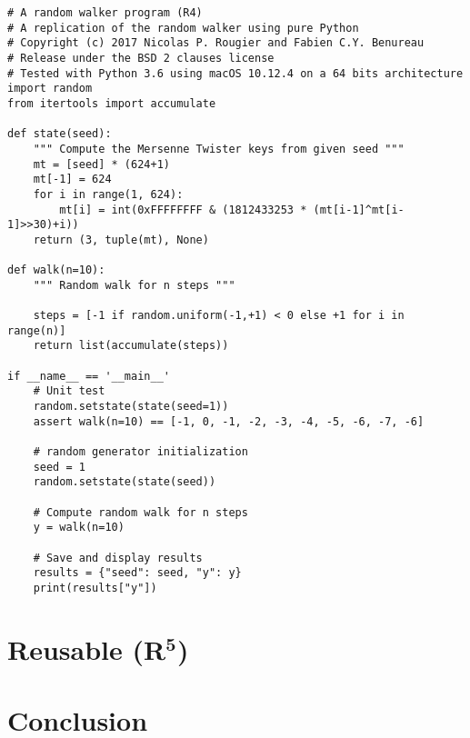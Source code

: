 \documentclass[a4paper,11pt]{article}
\begin{document}
\begin{lstlisting}
# A random walker program (R4)
# A replication of the random walker using pure Python
# Copyright (c) 2017 Nicolas P. Rougier and Fabien C.Y. Benureau
# Release under the BSD 2 clauses license
# Tested with Python 3.6 using macOS 10.12.4 on a 64 bits architecture
import random
from itertools import accumulate

def state(seed):
    """ Compute the Mersenne Twister keys from given seed """
    mt = [seed] * (624+1)
    mt[-1] = 624
    for i in range(1, 624):
        mt[i] = int(0xFFFFFFFF & (1812433253 * (mt[i-1]^mt[i-1]>>30)+i))
    return (3, tuple(mt), None)

def walk(n=10):
    """ Random walk for n steps """

    steps = [-1 if random.uniform(-1,+1) < 0 else +1 for i in range(n)]
    return list(accumulate(steps))

if __name__ == '__main__'
    # Unit test
    random.setstate(state(seed=1))
    assert walk(n=10) == [-1, 0, -1, -2, -3, -4, -5, -6, -7, -6]

    # random generator initialization
    seed = 1
    random.setstate(state(seed))
    
    # Compute random walk for n steps
    y = walk(n=10)
    
    # Save and display results
    results = {"seed": seed, "y": y}
    print(results["y"])
\end{lstlisting}

\clearpage
\section*{Reusable (R$^{\mathbf 5}$)}

\clearpage
\section*{Conclusion}


\renewcommand*{\bibfont}{\small}
\printbibliography[title=References]
\end{document}
